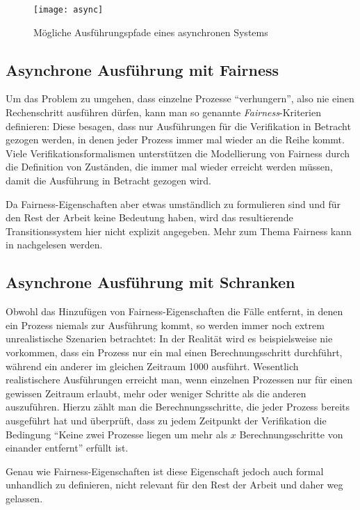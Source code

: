 \begin{figure}[h]
  \centering
  \texttt{[image: async]}
  \caption{Mögliche Ausführungspfade eines asynchronen Systems}
  \label{fig:asynchronous_paths}
\end{figure}
\subsection{Asynchrone Ausführung mit Fairness}
Um das Problem zu umgehen, dass einzelne Prozesse "`verhungern"', also nie einen Rechenschritt ausführen dürfen, kann man so genannte \emph{Fairness}-Kriterien definieren:
Diese besagen, dass nur Ausführungen für die Verifikation in Betracht gezogen werden, in denen jeder Prozess immer mal wieder an die Reihe kommt.
Viele Verifikationsformalismen unterstützen die Modellierung von Fairness durch die Definition von Zuständen, die immer mal wieder erreicht werden müssen, damit die Ausführung in Betracht gezogen wird.

Da Fairness-Eigenschaften aber etwas umständlich zu formulieren sind und für den Rest der Arbeit keine Bedeutung haben, wird das resultierende Transitionssystem hier nicht explizit angegeben.
Mehr zum Thema Fairness kann in \cite{model_checking_fairness} nachgelesen werden.
\subsection{Asynchrone Ausführung mit Schranken}
Obwohl das Hinzufügen von Fairness-Eigenschaften die Fälle entfernt, in denen ein Prozess niemals zur Ausführung kommt, so werden immer noch extrem unrealistische Szenarien betrachtet:
In der Realität wird es beispielsweise nie vorkommen, dass ein Prozess nur ein mal einen Berechnungsschritt durchführt, während ein anderer im gleichen Zeitraum 1000 ausführt.
Wesentlich realistischere Ausführungen erreicht man, wenn einzelnen Prozessen nur für einen gewissen Zeitraum erlaubt, mehr oder weniger Schritte als die anderen auszuführen.
Hierzu zählt man die Berechnungsschritte, die jeder Prozess bereits ausgeführt hat und überprüft, dass zu jedem Zeitpunkt der Verifikation die Bedingung "`Keine zwei Prozesse liegen um mehr als $x$ Berechnungsschritte von einander entfernt"' erfüllt ist.

Genau wie Fairness-Eigenschaften ist diese Eigenschaft jedoch auch formal unhandlich zu definieren, nicht relevant für den Rest der Arbeit und daher weg gelassen.
